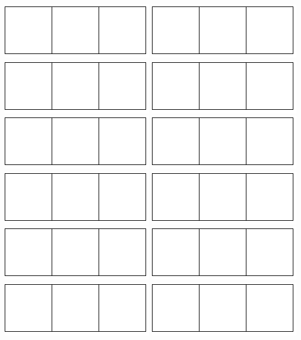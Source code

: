 \documentclass[a4paper]{oblivoir}
\begin{document}
\includegraphics[width=.2\textwidth]{2}\quad
\includegraphics[width=.2\textwidth]{2}\quad
\includegraphics[width=.2\textwidth]{2}\quad
\includegraphics[width=.2\textwidth]{2}\\[5pt]
\includegraphics[width=.2\textwidth]{2}\quad
\includegraphics[width=.2\textwidth]{2}\quad
\includegraphics[width=.2\textwidth]{2}\quad
\includegraphics[width=.2\textwidth]{2}\\[5pt]
\includegraphics[width=.2\textwidth]{2}\quad
\includegraphics[width=.2\textwidth]{2}\quad
\includegraphics[width=.2\textwidth]{2}\quad
\includegraphics[width=.2\textwidth]{2}\\[5pt]
\end{document}
